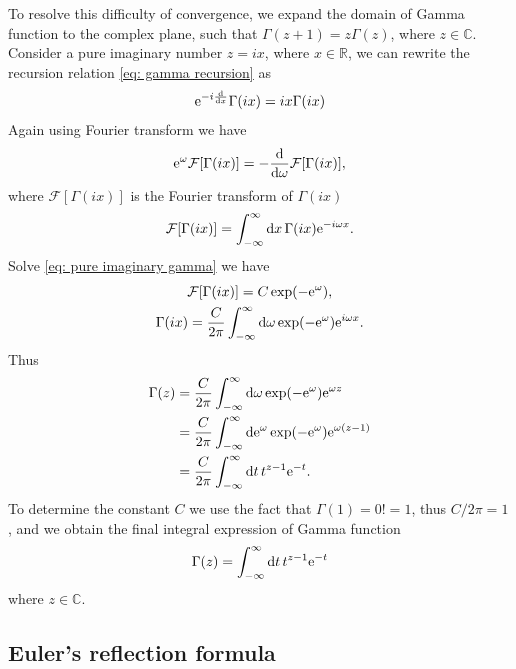\documentclass[10pt]{article}
\begin{document}
	To resolve this difficulty of convergence, we expand the domain of Gamma function to the complex plane, such that $\Gamma(z + 1) = z \Gamma(z)$, where $z \in \mathbb{C}$. Consider a pure imaginary number $z = i x$, where $x \in \mathbb{R}$, we can rewrite the recursion relation \eqref{eq: gamma recursion} as
	\begin{equation}
		{\mathrm{e}}^{-i \dv{x}} \Gamma(ix) = ix \Gamma(ix)
	\end{equation}
	Again using Fourier transform we have
	\begin{equation}
		{\mathrm{e}}^{\omega} \mathcal{F}[\Gamma(ix)] = - \dv{\omega} \mathcal{F}[\Gamma(ix)], \label{eq: pure imaginary gamma}
	\end{equation}
	where $\mathcal{F}[\Gamma(ix)]$ is the Fourier transform of $\Gamma(ix)$
	\begin{equation}
		\mathcal{F}[\Gamma(ix)] = \int_{-\infty}^{\infty} \dd{x} \Gamma(ix) {\mathrm{e}}^{- i \omega x}.
	\end{equation}
	Solve \eqref{eq: pure imaginary gamma} we have
	\begin{gather}
		\mathcal{F}[\Gamma(ix)] = C \exp(- {\mathrm{e}}^{\omega}), \\
		\Gamma(ix) = \frac{C}{2\pi} \int_{-\infty}^{\infty} \dd{\omega} \exp(- {\mathrm{e}}^{\omega}) {\mathrm{e}}^{i \omega x}.
	\end{gather}
	Thus
	\begin{align*}
		\Gamma(z) &= \frac{C}{2\pi} \int_{-\infty}^{\infty} \dd{\omega} \exp(- {\mathrm{e}}^{\omega}) {\mathrm{e}}^{\omega z} \\
		&= \frac{C}{2\pi} \int_{-\infty}^{\infty} \dd{{\mathrm{e}}^{\omega}} \exp(- {\mathrm{e}}^{\omega}) {\mathrm{e}}^{\omega (z-1)} \\
		&= \frac{C}{2\pi} \int_{-\infty}^{\infty} \dd{t} t^{z-1} {\mathrm{e}}^{-t}.
	\end{align*}
	To determine the constant $C$ we use the fact that $\Gamma(1) = 0! = 1$, thus $C/2\pi = 1$, and we obtain the final integral expression of Gamma function
	\begin{equation}
		\Gamma(z) = \int_{-\infty}^{\infty} \dd{t} t^{z-1} {\mathrm{e}}^{-t}
	\end{equation}
	where $z \in \mathbb{C}$.

	\subsection{Euler's reflection formula}
\end{document}

